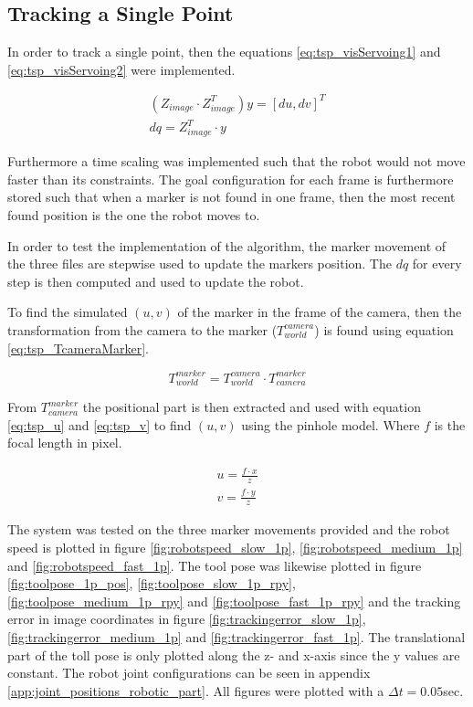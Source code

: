 \subsection{Tracking a Single Point}
In order to track a single point, then the equations \ref{eq:tsp_visServoing1} and \ref{eq:tsp_visServoing2}  were implemented.

\begin{eqnarray}
(Z_{image} \cdot Z_{image}^T) y = [du, dv]^T \label{eq:tsp_visServoing1} \\
dq = Z_{image}^T \cdot y \label{eq:tsp_visServoing2}
\end{eqnarray}

Furthermore a time scaling was implemented such that the robot would not move faster than its constraints.
The goal configuration for each frame is furthermore stored such that when a marker is not found in one frame, then the most recent found position is the one the robot moves to.

In order to test the implementation of the algorithm, the marker movement of the three files are stepwise used to update the markers position.
The $dq$ for every step is then computed and used to update the robot.

To find the simulated $(u,v)$ of the marker in the frame of the camera, then the transformation from the camera to the marker ($T_{world}^{camera}$) is found using equation \ref{eq:tsp_TcameraMarker}.

\begin{equation}
T_{world}^{marker} = T_{world}^{camera} \cdot T_{camera}^{marker} \label{eq:tsp_TcameraMarker}
\end{equation}

From $T_{camera}^{marker}$ the positional part is then extracted and used with equation \ref{eq:tsp_u} and \ref{eq:tsp_v} to find $(u,v)$ using the pinhole model.
Where $f$ is the focal length in pixel.

\begin{eqnarray}
u = \frac{f \cdot x}{z} \label{eq:tsp_u} \\
v = \frac{f \cdot y}{z} \label{eq:tsp_v}
\end{eqnarray}


The system was tested on the three marker movements provided and the robot speed is plotted in figure \ref{fig:robotspeed_slow_1p}, \ref{fig:robotspeed_medium_1p} and \ref{fig:robotspeed_fast_1p}.
The tool pose was likewise plotted in figure \ref{fig:toolpose_1p_pos}, \ref{fig:toolpose_slow_1p_rpy}, \ref{fig:toolpose_medium_1p_rpy} and \ref{fig:toolpose_fast_1p_rpy} and the tracking error in image coordinates in figure \ref{fig:trackingerror_slow_1p}, \ref{fig:trackingerror_medium_1p} and \ref{fig:trackingerror_fast_1p}.
The translational part of the toll pose is only plotted along the z- and x-axis since the y values are constant.
The robot joint configurations can be seen in appendix \ref{app:joint_positions_robotic_part}.
All figures were plotted with a $\Delta t = 0.05$sec.


